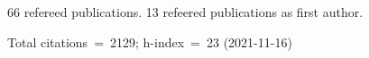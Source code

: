 66 refereed publications. 13 refeered publications as first author.

Total citations~=~2129; h-index~=~23 (2021-11-16)